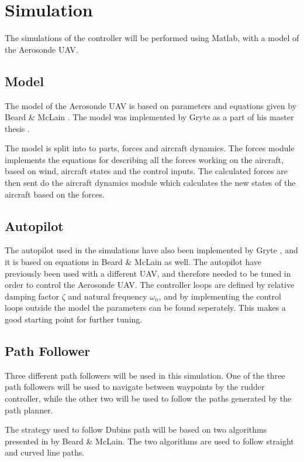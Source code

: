 \section{Simulation}
\label{ch:simulation}

The simulations of the controller will be performed using Matlab, with a model of the Aerosonde UAV. 

\subsection{Model}

The model of the Aerosonde UAV is based on parameters and equations given by Beard \& McLain \cite{suaBEARD}. The model was implemented by Gryte as a part of his master thesis \cite{GRYTE}.

The model is split into to parts, forces and aircraft dynamics. The forces module implements the equations for describing all the forces working on the aircraft, based on wind, aircraft states and the control inputs. The calculated forces are then sent do the aircraft dynamics module which calculates the new states of the aircraft based on the forces.


\subsection{Autopilot}

The autopilot used in the simulations have also been implemented by Gryte \cite{GRYTE}, and it is based on equations in Beard \& McLain \cite{suaBEARD} as well. The autopilot have previously been used with a different UAV, and therefore needed to be tuned in order to control the Aerosonde UAV. The controller loops are defined by relative damping factor $\zeta$ and natural frequency $\omega_n$, and by implementing the control loops outside the model the parameters can be found seperately. This makes a good starting point for further tuning.

\subsection{Path Follower}
\label{ch:path_follower}

Three different path followers will be used in this simulation. One of the three path followers will be used to navigate between waypoints by the rudder controller, while the other two will be used to follow the paths generated by the path planner.

The strategy used to follow Dubins path will be based on two algorithms presented in \cite{suaBEARD} by Beard \& McLain. The two algorithms are used to follow straight and curved line paths.

